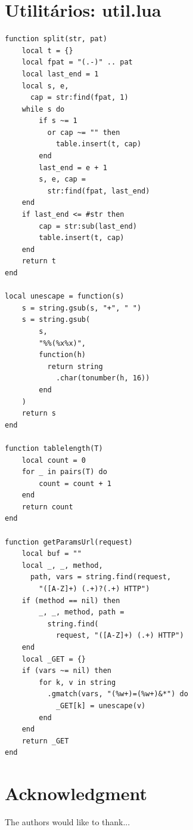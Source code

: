 \documentclass[journal]{IEEEtran}
\begin{document}
\section{Utilitários: util.lua}

\begin{verbatim}
function split(str, pat)
    local t = {} 
    local fpat = "(.-)" .. pat
    local last_end = 1
    local s, e, 
      cap = str:find(fpat, 1)
    while s do
        if s ~= 1 
          or cap ~= "" then
            table.insert(t, cap)
        end
        last_end = e + 1
        s, e, cap = 
          str:find(fpat, last_end)
    end
    if last_end <= #str then
        cap = str:sub(last_end)
        table.insert(t, cap)
    end
    return t
end

local unescape = function(s)
    s = string.gsub(s, "+", " ")
    s = string.gsub(
        s,
        "%%(%x%x)",
        function(h)
          return string
            .char(tonumber(h, 16))
        end
    )
    return s
end

function tablelength(T)
    local count = 0
    for _ in pairs(T) do
        count = count + 1
    end
    return count
end

function getParamsUrl(request)
    local buf = ""
    local _, _, method, 
      path, vars = string.find(request, 
        "([A-Z]+) (.+)?(.+) HTTP")
    if (method == nil) then
        _, _, method, path = 
          string.find(
            request, "([A-Z]+) (.+) HTTP")
    end
    local _GET = {}
    if (vars ~= nil) then
        for k, v in string
          .gmatch(vars, "(%w+)=(%w+)&*") do
            _GET[k] = unescape(v)
        end
    end
    return _GET
end

\end{verbatim}

\section*{Acknowledgment}


The authors would like to thank...


\ifCLASSOPTIONcaptionsoff
  \newpage
\fi



\end{document}
